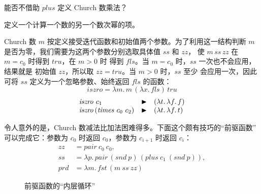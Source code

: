 \begin{exercise}[\(\star\star\)]
\label{ex:5.2.3}
能否不借助 \(\mathit{plus}\) 定义 Church 数乘法？
\end{exercise}

\begin{exercise}
\label{ex:5.2.4}
定义一个计算一个数的另一个数次幂的项。
\end{exercise}

Church 数 \(m\) 按定义接受迭代函数和初始值两个参数。为了利用这一结构判断
\(m\) 是否为零，我们需要为这两个参数分别选取具体值 \(ss\) 和 \(zz\)，
使 \(m\,ss\,zz\) 在 \(m=c_0\) 时得到 \(\mathit{tru}\)，在 \(m>0\) 时
得到 \(\mathit{fls}\)。当 \(m=c_0\) 时，\(ss\) 一次也不会应用，结果就是
初始值 \(zz\)，所以取 \(zz=\mathit{tru}\)。当 \(m>0\) 时，\(ss\) 至少
会应用一次，因此可将 \(ss\) 定义为一个忽略参数、始终返回
\(\mathit{fls}\) 的函数：
\[
 \mathit{iszro}=\lambda m.\,m\,(\lambda x.\,\mathit{fls})\,\mathit{tru}
\]
\[
\begin{array}{@{}l@{\quad\blacktriangleright\quad}l@{}}
 \mathit{iszro}\ c_1&(\lambda t.\,\lambda f.\,f)\\
 \mathit{iszro}\,(\mathit{times}\ c_0\ c_2)&
   (\lambda t.\,\lambda f.\,t)
\end{array}
\]

令人意外的是，Church 数减法比加法困难得多。下面这个颇有技巧的“前驱函数”
可以完成它：参数为 \(c_0\) 时返回 \(c_0\)，参数为 \(c_{i+1}\) 时返回
\(c_i\)：
\[
\begin{aligned}
 zz&=\mathit{pair}\ c_0\ c_0,\\
 ss&=\lambda p.\,
   \mathit{pair}\,(\mathit{snd}\ p)\,
   (\mathit{plus}\ c_1\ (\mathit{snd}\ p)),\\
 \mathit{prd}&=\lambda m.\,\mathit{fst}\,(m\ ss\ zz)
\end{aligned}
\]

\begin{figure}[htbp]
\centering
{}
\caption{前驱函数的“内层循环”}
\label{fig:5-1}
\end{figure}


